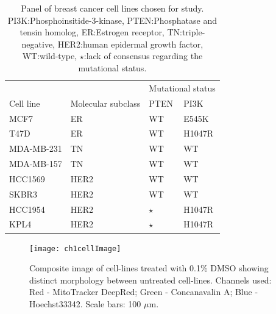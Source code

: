 \documentclass[a4paper,11pt,twoside,openright]{scrbook}
\begin{document}
\begin{table}[]
    \begin{footnotesize}
    \captionsetup{width=0.8\linewidth}
    \centering
    \caption[Panel of breast cancer cell lines chosen for study]{Panel of breast cancer cell lines chosen for study. 
PI3K:Phosphoinsitide-3-kinase, PTEN:Phosphatase and tensin homolog, ER:Estrogen receptor, TN:triple-negative, 
HER2:human epidermal growth factor, WT:wild-type, $\star$:lack of consensus regarding the mutational status.}
    \label{table:cell-lines}
    \begin{tabular}{@{}llll@{}}
    \toprule
               &                    & \multicolumn{2}{l}{Mutational status} \\
    Cell line  & Molecular subclass & PTEN             & PI3K               \\ \midrule
    MCF7       & ER                 & WT               & E545K              \\
    T47D       & ER                 & WT               & H1047R             \\
    MDA-MB-231 & TN                 & WT               & WT                 \\
    MDA-MB-157 & TN                 & WT               & WT                 \\
    HCC1569    & HER2               & WT               & WT                 \\
    SKBR3      & HER2               & WT               & WT                 \\
    HCC1954    & HER2               & $\star$          & H1047R             \\
    KPL4       & HER2               & $\star$          & H1047R             \\ \bottomrule
    \end{tabular}
    \end{footnotesize}
\end{table}

\begin{figure}
    \centering
    \texttt{[image: ch1cellImage]}
    \captionsetup{width=0.8\textwidth}
    \caption[Images of the eight breast cancer cell-lines]{
        Composite image of cell-lines treated with 0.1\% DMSO showing distinct morphology between untreated cell-lines.
        Channels used: Red - MitoTracker DeepRed; Green - Concanavalin A; Blue - Hoechst33342. Scale bars: 100 $\mu$m.
    }
    \label{figure:cell_images}
\end{figure}
\end{document}
